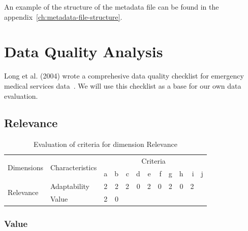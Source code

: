 An example of the structure of the metadata file can be found in the appendix~\ref{ch:metadata-file-structure}.

\section{Data Quality Analysis}

Long et al. (2004) wrote a comprehesive data quality checklist for emergency medical services data~\cite{long2004}.
We will use this checklist as a base for our own data evaluation.

\subsection{Relevance}

\begin{table}[htbp]
    \centering

    \begin{tabular}{llrrrrrrrrrr}
        \toprule
        \multirow{2}{*}{Dimensions} & \multirow{2}{*}{Characteristics}  & \multicolumn{10}{c}{Criteria}         \\ \cmidrule(lr){3-12}
                                    &                                   & a & b & c & d & e & f & g & h & i & j \\ \midrule
        \multirow{2}{*}{Relevance}  & Adaptability                      & 2 & 2 & 2 & 0 & 2 & 0 & 2 & 0 & 2 &   \\
                                    & Value                             & 2 & 0 &   &   &   &   &   &   &   &   \\
        \bottomrule
    \end{tabular}

    \caption{Evaluation of criteria for dimension Relevance}
    \label{table:relevance-benchmark}
\end{table}
\FloatBarrier

\subsubsection{Value}

